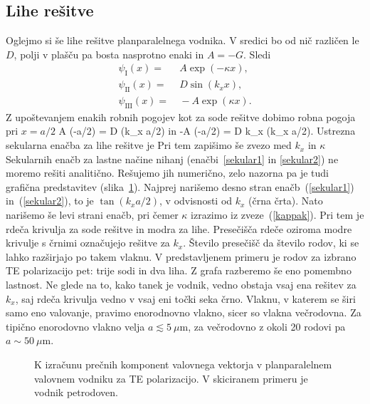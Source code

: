 \subsection*{Lihe rešitve}
Oglejmo si še lihe rešitve planparalelnega vodnika. V sredici bo od nič različen
le $D$, polji v plašču pa bosta nasprotno enaki in $A = -G$. Sledi
\begin{align}
\psi_{\mathrm{I}}(x) =&~ A \exp(-\kappa x),\\
\psi_{\mathrm{II}}(x) =&~ D \sin(k_x x),\\
\psi_{\mathrm{III}}(x) =&~ -A \exp(\kappa x).
\end{align}
Z upoštevanjem enakih robnih pogojev kot za sode rešitve dobimo robna pogoja pri $x=a/2$
\beq
A \exp(-\kappa a/2) = D \sin(k_x a/2)
\eeq
in 
\beq
-\kappa A \exp(-\kappa a/2) = D k_x \cos(k_x a/2).
\eeq
Ustrezna sekularna enačba za lihe rešitve je 
Pri tem zapišimo še zvezo med $k_x$ in $\kappa$
Sekularnih enačb za lastne načine nihanj (enačbi~\ref{sekular1} in \ref{sekular2}) ne moremo rešiti 
analitično. Rešujemo jih numerično, zelo nazorna pa je tudi grafična predstavitev (slika~\ref{fig:TEsec}). 
Najprej narišemo desno stran enačb~(\ref{sekular1}) in~(\ref{sekular2}), to je $\tan (k_x a/2)$, v odvisnosti
od $k_x$ (črna črta). Nato narišemo še levi strani enačb, pri čemer $\kappa$ izrazimo iz zveze~(\ref{kappak}).
Pri tem je rdeča krivulja za sode rešitve in modra za lihe. Presečišča rdeče oziroma modre krivulje s črnimi
označujejo rešitve za $k_x$. Število presečišč da število rodov, ki se lahko razširjajo po takem vlaknu. 
V predstavljenem primeru je rodov za izbrano TE polarizacijo pet: trije sodi in dva liha. Z grafa razberemo 
še eno pomembno lastnost. Ne glede na to, kako tanek je vodnik, vedno obstaja vsaj ena rešitev za $k_x$, 
saj rdeča krivulja vedno v vsaj eni točki seka črno. Vlaknu, v katerem se širi samo eno valovanje, 
pravimo enorodnovno vlakno, sicer so vlakna večrodovna. Za tipično enorodovno vlakno velja 
$a\lesssim 5~\mu$m, za večrodovno z okoli 20 rodovi pa $a\sim 50~\mu$m.
\begin{figure}[h]
\centering
\def\svgwidth{90truemm} 

\caption{K izračunu prečnih komponent valovnega vektorja v planparalelnem valovnem vodniku
za TE polarizacijo. V skiciranem primeru je vodnik petrodoven.}
\label{fig:TEsec}
\end{figure}


